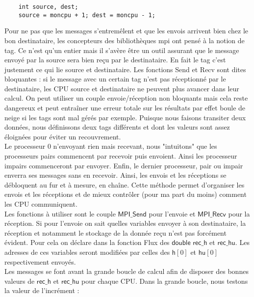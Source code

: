 \documentclass[french]{article}
\begin{document}
\begin{minipage}{455 pt}
\begin{lstlisting}
	int source, dest;	
	source = moncpu + 1; dest = moncpu - 1;
\end{lstlisting}
\end{minipage}

Pour ne pas que les messages s'entremêlent et que les envois arrivent bien chez le bon destinataire, les concepteurs des bibliothèques mpi ont pensé à la notion de tag. Ce n'est qu'un entier mais il s'avère être un outil assurant que le message envoyé par la source sera bien reçu par le destinataire. En fait le tag c'est justement ce qui lie source et destinataire. Les fonctions Send et Recv sont dites bloquantes : si le message avec un certain tag n'est pas réceptionné par le destinataire, les CPU source et destinataire ne peuvent plus avancer dans leur calcul. On peut utiliser un couple envoie/réception non bloquants mais cela reste dangereux et peut entraîner une erreur totale sur les résultats par effet boule de neige si les tags sont mal gérés par exemple. Puisque nous faisons transiter deux données, nous définissons deux tags différents et dont les valeurs sont assez éloignées pour éviter un recouvrement.\\
Le processeur 0 n'envoyant rien mais recevant, nous "intuitons" que les processeurs pairs commencent par recevoir puis envoient. Ainsi les processeur impairs commenceront par envoyer. Enfin, le dernier processeur, pair ou impair enverra ses messages sans en recevoir. Ainsi, les envois et les réceptions se débloquent au fur et à mesure, en chaîne. Cette méthode permet d'organiser les envois et les réceptions et de mieux contrôler (pour ma part du moins) comment les CPU communiquent.\\
Les fonctions à utiliser sont le couple $\mathsf{MPI\_ Send}$ pour l'envoie et $\mathsf{MPI\_ Recv}$ pour la réception. Si pour l'envoie on sait quelles variables envoyer à son destinataire, la réception et notamment le stockage de la donnée reçu n'est pas forcément évident. Pour cela on déclare dans la fonction Flux des $\mathsf{double}$ $\mathsf{rec\_ h}$ et $\mathsf{rec\_ hu}$. Les adresses de ces variables seront modifiées par celles des $\mathsf{h}[0]$ et $\mathsf{hu}[0]$ respectivement envoyés.\\

\noindent Les messages se font avant la grande boucle de calcul afin de disposer des bonnes valeurs de $\mathsf{rec\_ h}$ et $\mathsf{rec\_ hu}$ pour chaque CPU. Dans la grande boucle, nous testons la valeur de l'incrément : 
\end{document}
